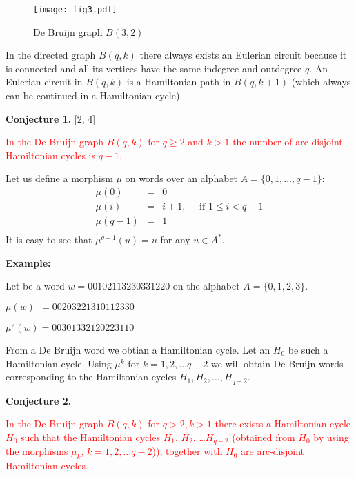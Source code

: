 \documentclass[10pt]{article}
\begin{document}
\begin{figure}[t]
\centering\texttt{[image: fig3.pdf]}
\label{br32}\caption{De Bruijn graph $B(3,2)$} 
\end{figure}



\medskip\noindent 
In the directed graph $B(q,k)$ there always exists an Eulerian circuit because
it is connected and  all its
vertices have the same indegree and outdegree $q$. An Eulerian
circuit in $B(q,k)$  is a Hamiltonian path in $B(q,k+1)$ (which always can
be continued in a Hamiltonian cycle).		 



\medskip\noindent\textbf{{Conjecture 1.}} [2, 4]

\noindent\textcolor{red}{In the De Bruijn graph $B(q,k)$ for $q\ge 2$ and $k>1$ the number of arc-disjoint Hamiltonian cycles is $q-1$.}

\medskip\noindent
Let us define a morphism $\mu$ on words over an alphabet $A=\{0,1,\ldots, q-1\}$:
\begin{eqnarray*}
\mu(0)   &=& 0\\
\mu(i)   &=& i+1, \quad \textrm{ if } 1\le i <q-1\\
\mu(q-1) &=& 1 \\
\end{eqnarray*}
It is easy to see that $\mu^{q-1}(u)=u$ for any $u\in A^*$.

\medskip\noindent\textbf{Example:} 

Let be a word $w=00102113230331220$ on the alphabet $A=\{0,1,2,3\}$.

$\mu(w)\;\, ={00203221310112330}$ 

$\mu^2(w)={00301332120223110}$

\medskip\noindent
From a De Bruijn word we obtian a Hamiltonian cycle. Let an $H_0$ be such a Hamiltonian cycle. Using $\mu^k$ for $k=1,2,\ldots q-2$ we will obtain De Bruijn words corresponding to the Hamiltonian cycles $H_1, H_2, \ldots, H_{q-2}$. 


 
\medskip\noindent\textbf{{Conjecture 2.}}

\noindent\textcolor{red}{In the De Bruijn graph $B(q,k)$ for {$q>2, k>1$} there exists a Hamiltonian cycle {$H_0$} such that the Hamiltonian cycles  $H_1$, $H_2$, \ldots $H_{q-2}$ (obtained from {$H_0$} by using the morphisms $\mu_k$, $k=1,2,\ldots q-2$)), together with $H_0$ are  arc-disjoint Hamiltonian cycles.}
\end{document}
